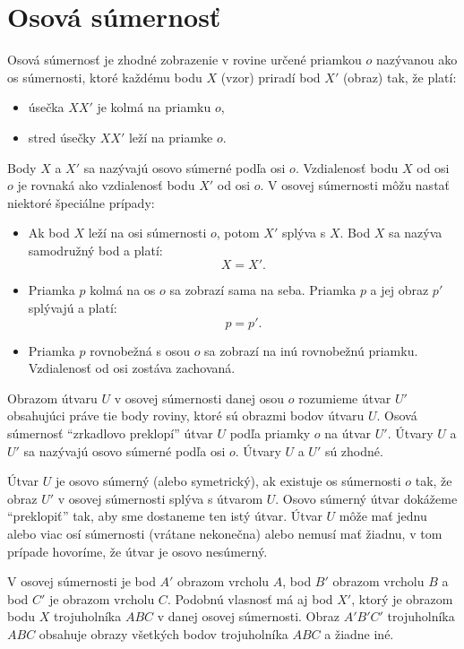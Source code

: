 \documentclass{article}
\begin{document}
\section{Osová súmernosť}

Osová súmernosť je zhodné zobrazenie v rovine určené priamkou \(o\) nazývanou ako os súmernosti, ktoré každému bodu \(X\) (vzor) priradí bod \(X'\) (obraz) tak, že platí:
\begin{itemize}
  \item úsečka \(XX'\) je kolmá na priamku \(o\),
  \item stred úsečky \(XX'\) leží na priamke \(o\).
\end{itemize}

Body \(X\) a \(X'\) sa nazývajú osovo súmerné podľa osi \(o\). Vzdialenosť bodu \(X\) od osi \(o\) je rovnaká ako vzdialenosť bodu \(X'\) od osi \(o\). V osovej súmernosti môžu nastať niektoré špeciálne prípady:
\begin{itemize}
  \item Ak bod \(X\) leží na osi súmernosti \(o\), potom \(X'\) splýva s \(X\). Bod \(X\) sa nazýva samodružný bod a platí:
  \[
  X = X'.
  \]
  \item Priamka \(p\) kolmá na os \(o\) sa zobrazí sama na seba. Priamka \(p\) a jej obraz \(p'\) splývajú a platí:
  \[
  p = p'.
  \]
  \item Priamka \(p\) rovnobežná s osou \(o\) sa zobrazí na inú rovnobežnú priamku. Vzdialenosť od osi zostáva zachovaná.
\end{itemize}

Obrazom útvaru \(U\) v osovej súmernosti danej osou \(o\) rozumieme útvar \(U'\) obsahujúci práve tie body roviny, ktoré sú obrazmi bodov útvaru \(U\). Osová súmernosť \enquote{zrkadlovo preklopí} útvar \(U\) podľa priamky \(o\) na útvar \(U'\). Útvary \(U\) a \(U'\) sa nazývajú osovo súmerné podľa osi \(o\). Útvary \(U\) a \(U'\) sú zhodné.

Útvar \(U\) je osovo súmerný (alebo symetrický), ak existuje os súmernosti \(o\) tak, že obraz \(U'\) v osovej súmernosti splýva s útvarom \(U\). Osovo súmerný útvar dokážeme \enquote{preklopiť} tak, aby sme dostaneme ten istý útvar. Útvar \(U\) môže mať jednu alebo viac osí súmernosti (vrátane nekonečna) alebo nemusí mať žiadnu, v tom prípade hovoríme, že útvar je osovo nesúmerný.

V osovej súmernosti je bod \(A'\) obrazom vrcholu \(A\), bod \(B'\) obrazom vrcholu \(B\) a bod \(C'\) je obrazom vrcholu \(C\). Podobnú vlasnosť má aj bod \(X'\), ktorý je obrazom bodu \(X\) trojuholníka \(ABC\) v danej osovej súmernosti. Obraz \(A'B'C'\) trojuholníka \(ABC\) obsahuje obrazy všetkých bodov trojuholníka \(ABC\) a žiadne iné.
\end{document}
